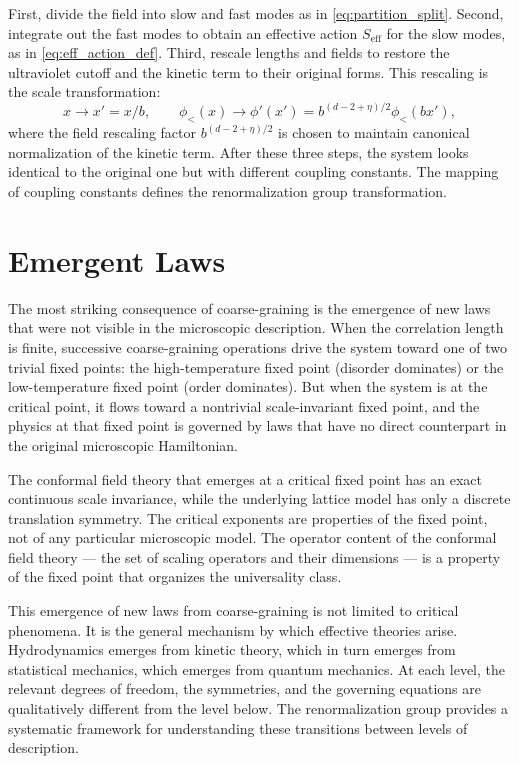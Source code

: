 \documentclass[11pt, twoside, openright]{book}
\theoremstyle{dotted}
\theoremstyle{definition}
\begin{document}
First, divide the field into slow and fast modes as in \eqref{eq:partition_split}.
Second, integrate out the fast modes to obtain an effective action $S_{\text{eff}}$
for the slow modes, as in \eqref{eq:eff_action_def}. Third, rescale lengths and
fields to restore the ultraviolet cutoff and the kinetic term to their original
forms. This rescaling is the scale transformation:
\begin{equation}
  x \to x' = x/b, \qquad \phi_<(x) \to \phi'(x') = b^{(d-2+\eta)/2}\phi_<(bx'),
  \label{eq:scale_transformation}
\end{equation}
where the field rescaling factor $b^{(d-2+\eta)/2}$ is chosen to maintain canonical
normalization of the kinetic term. After these three steps, the system looks
identical to the original one but with different coupling constants. The mapping
of coupling constants defines the renormalization group transformation.

\section{Emergent Laws}

The most striking consequence of coarse-graining is the emergence of new laws
that were not visible in the microscopic description. When the correlation length
is finite, successive coarse-graining operations drive the system toward one of
two trivial fixed points: the high-temperature fixed point (disorder dominates) or
the low-temperature fixed point (order dominates). But when the system is at the
critical point, it flows toward a nontrivial scale-invariant fixed point, and the
physics at that fixed point is governed by laws that have no direct counterpart in
the original microscopic Hamiltonian.

The conformal field theory that emerges at a critical fixed point has an exact
continuous scale invariance, while the underlying lattice model has only a discrete
translation symmetry. The critical exponents are properties of the fixed point, not
of any particular microscopic model. The operator content of the conformal field
theory --- the set of scaling operators and their dimensions --- is a property of
the fixed point that organizes the universality class.

This emergence of new laws from coarse-graining is not limited to critical phenomena.
It is the general mechanism by which effective theories arise. Hydrodynamics emerges
from kinetic theory, which in turn emerges from statistical mechanics, which emerges
from quantum mechanics. At each level, the relevant degrees of freedom, the symmetries,
and the governing equations are qualitatively different from the level below.
The renormalization group provides a systematic framework for understanding these
transitions between levels of description.
\end{document}
